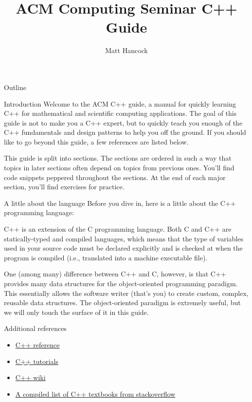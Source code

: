 \documentclass[presentation]{beamer}
\author{Matt Hancock}
\date{}
\title{ACM Computing Seminar C++ Guide}
\begin{document}
\maketitle
\begin{frame}{Outline}
\tableofcontents
\end{frame}


\begin{frame}[label={sec:orgheadline1}]{Introduction}
Welcome to the ACM C++ guide, a manual for quickly learning C++
for mathematical and scientific computing applications. The goal of 
this guide is not to make you a C++ expert, but to quickly teach 
you enough of the C++ fundamentals and design patterns to help you 
off the ground. If you should like to go beyond this guide, a 
few references are listed below.

This guide is split into sections. The sections are ordered in such a way
that topics in later sections often depend on topics from previous ones. 
You'll find code snippets peppered throughout the sections. At the end of 
each major section, you'll find exercises for practice.

\begin{block}{A little about the language}
Before you dive in, here is a little about the C++ programming language:

C++ is an extension of the C programming language. Both C and C++ are 
\alert{statically-typed} and \alert{compiled} languages, which means that the \alert{type} 
of variables used in your source code must be declared explicitly and is 
checked at when the program is compiled (i.e., translated into a machine 
executable file).

One (among many) difference between C++ and C, however, is that C++ provides 
many data structures for the object-oriented programming paradigm. This 
essentially allows the software writer (that's you) to create custom, complex, 
reusable data structures. The object-oriented paradigm is extremely useful, 
but we will only touch the surface of it in this guide.
\end{block}

\begin{block}{Additional references}
\begin{itemize}
\item \href{http://cppreference.com}{C++ reference}
\item \href{http://www.cplusplus.com/doc/tutorial}{C++ tutorials}
\item \href{https://en.wikipedia.org/wiki/C\%2B\%2B}{C++ wiki}
\item \href{http://stackoverflow.com/questions/388242/the-definitive-c-book-guide-and-list}{A compiled list of C++ textbooks from stackoverflow}
\end{itemize}
\end{block}
\end{frame}
\end{document}

